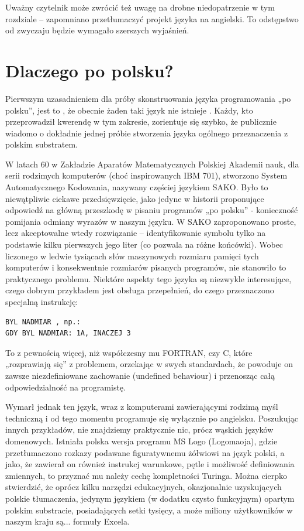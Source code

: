 Uważny czytelnik może zwrócić też uwagę na drobne niedopatrzenie w tym rozdziale – zapomniano  przetłumaczyć projekt języka na angielski. To odstępstwo od zwyczaju będzie wymagało szerszych wyjaśnień.

\section{Dlaczego po polsku?}
Pierwszym uzasadnieniem dla próby skonstruowania języka programowania „po polsku”, jest to , że obecnie żaden taki język nie istnieje . Każdy, kto przeprowadził kwerendę w tym zakresie, zorientuje się szybko, że publicznie wiadomo o dokładnie jednej próbie stworzenia języka ogólnego przeznaczenia z polskim substratem.

W latach 60 w Zakładzie Aparatów Matematycznych Polskiej Akademii nauk, dla serii rodzimych komputerów (choć inspirowanych IBM 701), stworzono System Automatycznego Kodowania, nazywany częściej językiem SAKO.\cite{SAKO} Było to niewątpliwie ciekawe przedsięwzięcie, jako jedyne w historii proponujące odpowiedź na główną przeszkodę w pisaniu programów „po polsku” - konieczność pomijania odmiany wyrazów w naszym języku. W SAKO zaproponowano proste, lecz akceptowalne wtedy rozwiązanie – identyfikowanie symbolu tylko na podstawie kilku pierwszych jego liter (co pozwala na różne końcówki). Wobec liczonego w ledwie tysiącach słów maszynowych rozmiaru pamięci tych komputerów i konsekwentnie rozmiarów pisanych programów, nie stanowiło to praktycznego problemu.
Niektóre aspekty tego języka są niezwykle interesujące, czego dobrym przykładem jest obsługa przepełnień, do czego przeznaczono specjalną instrukcję:
\begin{lstlisting}
BYL NADMIAR , np.:
GDY BYL NADMIAR: 1A, INACZEJ 3 
\end{lstlisting}
To z pewnością więcej, niż współczesny mu FORTRAN, czy C, które „rozprawiają się” z problemem, orzekając w swych standardach, że powoduje on zawsze niezdefiniowane zachowanie (undefined behaviour) i przenosząc całą odpowiedzialność na programistę.

Wymarł jednak ten język, wraz z komputerami zawierającymi rodzimą myśl techniczną i od tego momentu programuje się wyłącznie po angielsku.
Poszukując innych przykładów, nie znajdziemy praktycznie nic, prócz wąskich języków domenowych. Istniała polska wersja programu MS Logo (Logomaoja), gdzie przetłumaczono rozkazy podawane figuratywnemu żółwiowi na język polski, a jako, że zawierał on również instrukcj warunkowe, pętle i możliwość definiowania zmiennych, to przyznać mu należy cechę kompletności Turinga. Można cierpko stwierdzić, że oprócz kilku narzędzi edukacyjnych, okazjonalnie uzyskujących polskie tłumaczenia, jedynym językiem (w dodatku czysto funkcyjnym) opartym polskim substracie, posiadających setki tysięcy, a może miliony użytkowników w naszym kraju są... formuły Excela.

